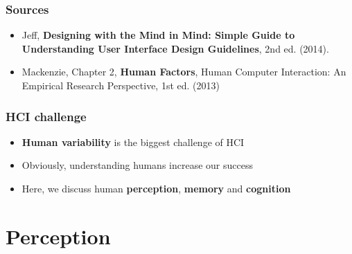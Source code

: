\documentclass{beamer}
\begin{document}
\begin{frame}
\frametitle{Sources} 
\begin{itemize}
	\item Jeff, \textbf{Designing with the Mind in Mind: Simple Guide to Understanding User Interface Design Guidelines}, 2nd ed. (2014).
	\item Mackenzie, Chapter 2, \textbf{Human Factors},  Human Computer Interaction: An Empirical Research Perspective, 1st ed. (2013) 
\end{itemize}
\end{frame}

\begin{frame}
	\frametitle{HCI challenge}
	\begin{itemize}
		\item \textbf{Human variability} is the biggest challenge of HCI
		\item Obviously, understanding humans increase our success
		\item Here, we discuss human \textbf{perception}, \textbf{memory} and \textbf{cognition} 
	\end{itemize}
\end{frame}




\section{Perception}
\end{document}
